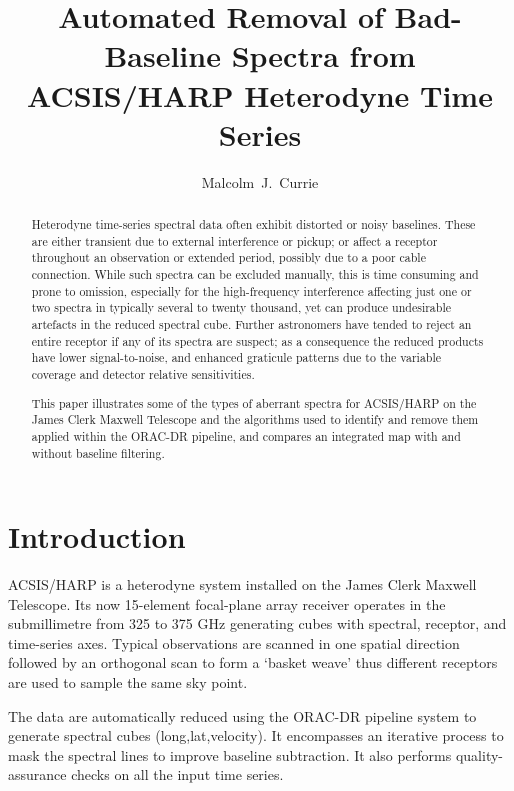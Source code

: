 
\resetcounters



\title{Automated Removal of Bad-Baseline Spectra from ACSIS/HARP
Heterodyne Time Series}
\author{Malcolm~J.~Currie
}


\begin{abstract}
Heterodyne time-series spectral data often exhibit distorted or noisy 
baselines. These are either transient due to external interference or 
pickup; or affect a receptor throughout an observation or extended 
period, possibly due to a poor cable connection. While such spectra can 
be excluded manually, this is time consuming and prone to omission, 
especially for the high-frequency interference affecting just one or two 
spectra in typically several to twenty thousand, yet can produce undesirable 
artefacts in the reduced spectral cube. Further astronomers have tended 
to reject an entire receptor if any of its spectra are suspect; as a 
consequence the reduced products have lower signal-to-noise, and 
enhanced graticule patterns due to the variable coverage and detector 
relative sensitivities.

This paper illustrates some of the types of aberrant spectra for
ACSIS/HARP on the James Clerk Maxwell Telescope and the algorithms
used to identify and remove them applied within the ORAC-DR pipeline,
and compares an integrated map with and without baseline filtering. 
\end{abstract}

\section{Introduction}

ACSIS/HARP \citep{buckle_2009} is a heterodyne system installed on
the James Clerk Maxwell Telescope. Its now 15-element focal-plane
array receiver operates in the submillimetre from 325 to 375 GHz
generating cubes with spectral, receptor, and time-series axes.
Typical observations are scanned in one spatial direction followed by
an orthogonal scan to form a `basket weave' thus different receptors
are used to sample the same sky point.

The data are automatically reduced using the ORAC-DR pipeline system
\citep{cavanagh_2008,jenness_2008} to generate spectral cubes
(long,lat,velocity). It encompasses an iterative process to mask the
spectral lines to improve baseline subtraction.  It also performs
quality-assurance checks on all the input time series.

